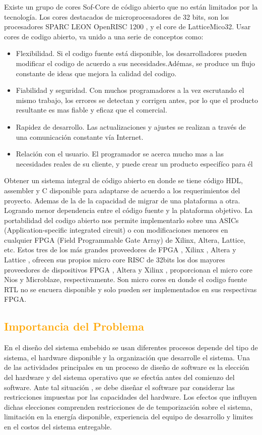 \documentclass[a4paper,11pt]{article}
\begin{document}
Existe un grupo de cores Sof-Core de código abierto que no están limitados por la tecnología. Los cores destacados de microprocesadores de 32 bits, son los procesadores SPARC LEON OpenRISC 1200 , y el core de LatticeMico32. Usar cores de  codigo abierto,  va unido a una serie de conceptos como:
 \begin {itemize}
\item Flexibilidad. Si el codigo fuente está disponible, los desarrolladores pueden modificar el codigo de acuerdo a sus necesidades.Adémas, se produce un flujo constante de ideas que mejora la calidad del codigo.
\item Fiabilidad y seguridad. Con muchos programadores a la vez escrutando el mismo trabajo, los errores se detectan y corrigen antes, por lo que el producto resultante es mas fiable y eficaz que el comercial.
\item Rapidez de desarrollo. Las actualizaciones y ajustes se realizan a través de una comunicación constante vía Internet.
\item Relación con el usuario. El programador se acerca mucho mas a las necesidades reales de su cliente, y puede crear un producto especifíco para él
 \end {itemize}
 
Obtener un sistema integral de código abierto en donde se tiene código HDL, assembler y C disponible para adaptarse de acuerdo a los requerimientos del proyecto. Ademas de la de la capacidad de migrar de una plataforma a otra. Logrando menor dependencia entre el código fuente y la plataforma objetivo. 
La portabilidad del codigo abierto nos permite implementarlo sobre una ASICs (Application-specific integrated circuit) o con modificaciones menores en cualquier FPGA (Field Programmable Gate Array) de Xilinx, Altera, Lattice, etc. 
Estos tres de los más grandes proveedores de FPGA , Xilinx , Altera y Lattice , ofrecen sus propios micro core RISC de 32bits los dos mayores proveedores de dispositivos FPGA , Altera y Xilinx , proporcionan el micro core Nios y Microblaze, respectivamente. Son micro cores  en donde el codigo fuente RTL no se encuera disponible y solo pueden ser implementados en sus respectivas FPGA.

\subsection{\textcolor{orange}{Importancia del Problema}}

En el diseño del sistema embebido se usan diferentes procesos depende del tipo de sistema, el hardware disponible y la organización que desarrolle el sistema. Una de las actividades principales en un proceso de diseño de software es la elección del hardware y del sistema operativo que se efectúa antes del comienzo del software. Ante tal situación , se debe diseñar el software par considerar las restricciones impuestas por las capacidades del hardware.
Los efectos que influyen dichas elecciones comprenden restricciones de de temporización sobre el sistema, limitación en la energía disponible, experiencia del equipo de desarrollo y limites en el costos del sistema entregable.
 
\end{document}
